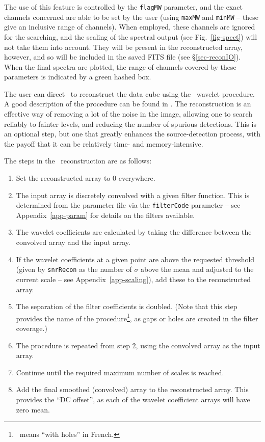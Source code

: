 The use of this feature is controlled by the \texttt{flagMW}
parameter, and the exact channels concerned are able to be set by the
user (using \texttt{maxMW} and \texttt{minMW} -- these give an
inclusive range of channels). When employed, these channels are
ignored for the searching, and the scaling of the spectral output (see
Fig.~\ref{fig-spect}) will not take them into account. They will be
present in the reconstructed array, however, and so will be included
in the saved FITS file (see \S\ref{sec-reconIO}). When the final
spectra are plotted, the range of channels covered by these parameters
is indicated by a green hashed box.

\label{sec-recon}

The user can direct \duchamp\ to reconstruct the data cube using the
\atrous\ wavelet procedure. A good description of the procedure can be
found in \citet{starck02:book}. The reconstruction is an effective way
of removing a lot of the noise in the image, allowing one to search
reliably to fainter levels, and reducing the number of spurious
detections. This is an optional step, but one that greatly enhances
the source-detection process, with the payoff that it can be
relatively time- and memory-intensive.


The steps in the \atrous\ reconstruction are as follows:
\begin{enumerate}
\item Set the reconstructed array to 0 everywhere.
\item The input array is discretely convolved with a given filter
  function. This is determined from the parameter file via the
  \texttt{filterCode} parameter -- see Appendix~\ref{app-param} for
  details on the filters available.
\item The wavelet coefficients are calculated by taking the difference
  between the convolved array and the input array.
\item If the wavelet coefficients at a given point are above the
  requested threshold (given by \texttt{snrRecon} as the number of
  $\sigma$ above the mean and adjusted to the current scale -- see
  Appendix~\ref{app-scaling}), add these to the reconstructed array.
\item The separation of the filter coefficients is doubled. (Note that
  this step provides the name of the procedure\footnote{\atrous\ means
  ``with holes'' in French.}, as gaps or holes are created in the
  filter coverage.)
\item The procedure is repeated from step 2, using the convolved array
  as the input array.
\item Continue until the required maximum number of scales is reached.
\item Add the final smoothed (\ie convolved) array to the
  reconstructed array. This provides the ``DC offset'', as each of the
  wavelet coefficient arrays will have zero mean.
\end{enumerate}

